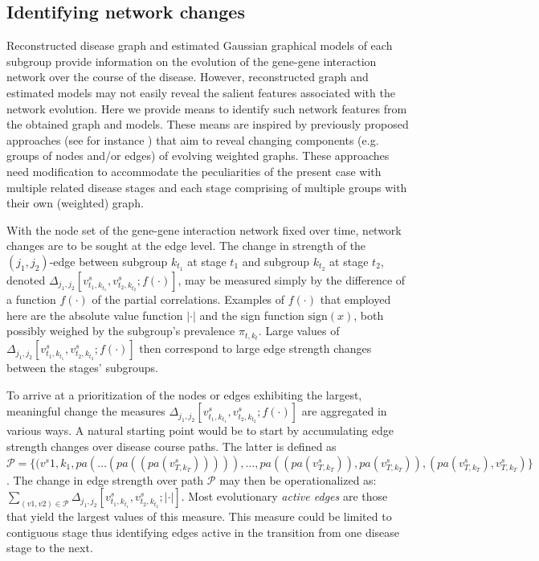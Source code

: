 \documentclass[10pt]{article}
\begin{document}
\subsection{Identifying network changes} \label{topology}
Reconstructed disease graph and estimated Gaussian graphical models of each subgroup provide information on the evolution of the gene-gene interaction network over the course of the disease. However, reconstructed graph and estimated models may not easily reveal the salient features associated with the network evolution. Here we provide means to identify such network features from the obtained graph and models. These means are inspired by previously proposed approaches (see for instance \citet{bunke2006,sricharan2014}) that aim to reveal changing components (e.g. groups of nodes and/or edges) of evolving weighted graphs. These approaches need modification to accommodate the peculiarities of the present case with multiple related disease stages and each stage comprising of multiple groups with their own (weighted) graph.


With the node set of the gene-gene interaction network fixed over time, network changes are to be sought at the edge level. The change in strength of the $(j_1, j_2)$-edge between subgroup $k_{t_1}$ at stage $t_1$ and subgroup $k_{t_2}$ at stage $t_2$, denoted $\Delta_{j_1,j_2} [v^s_{t_1, k_{t_1}}, v^s_{t_2, k_{t_2}}; f(\cdot)]$, may be measured simply by the difference of a function $f(\cdot)$ of the partial correlations. Examples of $f(\cdot)$ that employed here are the absolute value function $| \cdot |$ and the sign function $\mbox{sign}(x)$, both possibly weighed by the subgroup's prevalence $\pi_{t,k_t}$. Large values of $\Delta_{j_1,j_2} [v^s_{t_1, k_{t_1}}, v^s_{t_2, k_{t_2}}; f(\cdot)]$ then correspond to large edge strength changes between the stages' subgroups.

To arrive at a prioritization of the nodes or edges exhibiting the largest, meaningful change the measures $\Delta_{j_1,j_2} [v^s_{t_1, k_{t_1}}, v^s_{t_2, k_{t_2}}; f(\cdot)]$ are aggregated in various ways. A natural starting point would be to start by accumulating edge strength changes over disease course paths. The latter is defined as $\mathcal{P} = \{ (v^s{1,k_1}, pa(\ldots (pa((pa(v^s_{T,k_T} ))))), \ldots , pa((pa(v^s_{T,k_T} )), pa(v^s_{T,k_T} )), (pa(v^s_{T,k_T} ), v^s_{T,k_T} ) \}$. The change in edge strength over path $\mathcal{P}$ may then be operationalized as: $\sum_{(v1,v2)\in \mathcal{P}} \Delta_{j_1,j_2} [v^s_{t_1, k_{t_1}}, v^s_{t_2, k_{t_2}}; |\cdot| ]$. Most evolutionary \textit{active edges} are those that yield the largest values of this measure. This measure could be limited to contiguous stage thus identifying edges active in the transition from one disease stage to the next.
\end{document}
